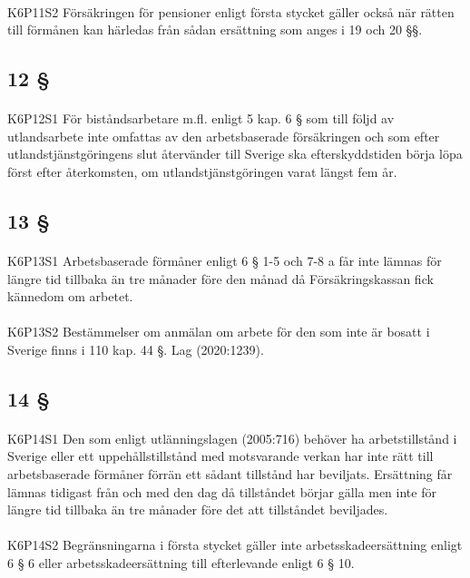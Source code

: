 \documentclass[a4paper,notitlepage,openany,10pt]{book}
\begin{document}
\paragraph*{}
{\tiny K6P11S2}
Försäkringen för pensioner enligt första stycket gäller också när rätten till förmånen kan härledas från sådan ersättning som anges i 19 och 20 §§.
\subsection*{12 §}
\paragraph*{}
{\tiny K6P12S1}
För biståndsarbetare m.fl. enligt 5 kap. 6 § som till följd av utlandsarbete inte omfattas av den arbetsbaserade försäkringen och som efter utlandstjänstgöringens slut återvänder till Sverige ska efterskyddstiden börja löpa först efter återkomsten, om utlandstjänstgöringen varat längst fem år.
\subsection*{13 §}
\paragraph*{}
{\tiny K6P13S1}
Arbetsbaserade förmåner enligt 6 § 1-5 och 7-8 a får inte lämnas för längre tid tillbaka än tre månader före den månad då Försäkringskassan fick kännedom om arbetet.
\paragraph*{}
{\tiny K6P13S2}
Bestämmelser om anmälan om arbete för den som inte är bosatt i Sverige finns i 110 kap. 44 §.
Lag (2020:1239).
\subsection*{14 §}
\paragraph*{}
{\tiny K6P14S1}
Den som enligt utlänningslagen (2005:716) behöver ha arbetstillstånd i Sverige eller ett uppehållstillstånd med motsvarande verkan har inte rätt till arbetsbaserade förmåner förrän ett sådant tillstånd har beviljats. Ersättning får lämnas tidigast från och med den dag då tillståndet börjar gälla men inte för längre tid tillbaka än tre månader före det att tillståndet beviljades.
\paragraph*{}
{\tiny K6P14S2}
Begränsningarna i första stycket gäller inte arbetsskadeersättning enligt 6 § 6 eller arbetsskadeersättning till efterlevande enligt 6 § 10.
\end{document}

